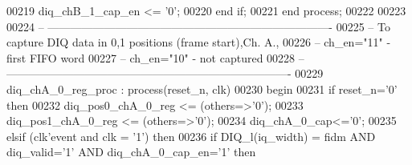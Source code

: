 \begin{DoxyCode}
00219       \textcolor{vhdlchar}{diq_chB_1_cap_en} \textcolor{vhdlchar}{<=} \textcolor{vhdlchar}{'}\textcolor{vhdllogic}{}\textcolor{vhdllogic}{0}\textcolor{vhdlchar}{'};
00220    \textcolor{keywordflow}{end} \textcolor{keywordflow}{if};
00221 \textcolor{keywordflow}{end} \textcolor{keywordflow}{process};
00222     
00223     
00224 \textcolor{keyword}{-- ----------------------------------------------------------------------------}
00225 \textcolor{keyword}{-- To capture DIQ data in 0,1 positions (frame start),Ch. A., }
00226 \textcolor{keyword}{-- ch\_en="11" - first FIFO word}
00227 \textcolor{keyword}{-- ch\_en="10" - not captured}
00228 \textcolor{keyword}{-- ----------------------------------------------------------------------------}
00229  diq\_chA\_0\_reg\_proc : \textcolor{keywordflow}{process}(reset_n, clk)
00230 \textcolor{vhdlkeyword}{    begin}
00231       \textcolor{keywordflow}{if} \textcolor{vhdlchar}{reset_n}\textcolor{vhdlchar}{=}\textcolor{vhdlchar}{'}\textcolor{vhdllogic}{}\textcolor{vhdllogic}{0}\textcolor{vhdlchar}{'} \textcolor{keywordflow}{then}
00232          \textcolor{vhdlchar}{diq_pos0_chA_0_reg} \textcolor{vhdlchar}{<=} \textcolor{vhdlchar}{(}\textcolor{keywordflow}{others}\textcolor{vhdlchar}{=}\textcolor{vhdlchar}{>}\textcolor{vhdlchar}{'}\textcolor{vhdllogic}{}\textcolor{vhdllogic}{0}\textcolor{vhdlchar}{'}\textcolor{vhdlchar}{)};
00233          \textcolor{vhdlchar}{diq_pos1_chA_0_reg} \textcolor{vhdlchar}{<=} \textcolor{vhdlchar}{(}\textcolor{keywordflow}{others}\textcolor{vhdlchar}{=}\textcolor{vhdlchar}{>}\textcolor{vhdlchar}{'}\textcolor{vhdllogic}{}\textcolor{vhdllogic}{0}\textcolor{vhdlchar}{'}\textcolor{vhdlchar}{)};
00234          \textcolor{vhdlchar}{diq_chA_0_cap}\textcolor{vhdlchar}{<=}\textcolor{vhdlchar}{'}\textcolor{vhdllogic}{}\textcolor{vhdllogic}{0}\textcolor{vhdlchar}{'};
00235       \textcolor{keywordflow}{elsif} \textcolor{vhdlchar}{(}\textcolor{vhdlchar}{clk}\textcolor{vhdlchar}{'}\textcolor{vhdlkeyword}{event} \textcolor{keywordflow}{and} \textcolor{vhdlchar}{clk} \textcolor{vhdlchar}{=} \textcolor{vhdlchar}{'}\textcolor{vhdllogic}{}\textcolor{vhdllogic}{1}\textcolor{vhdlchar}{'}\textcolor{vhdlchar}{)} \textcolor{keywordflow}{then}
00236             \textcolor{keywordflow}{if} \textcolor{vhdlchar}{DIQ_l}\textcolor{vhdlchar}{(}\textcolor{vhdlchar}{iq_width}\textcolor{vhdlchar}{)} \textcolor{vhdlchar}{=} \textcolor{vhdlchar}{fidm} \textcolor{keywordflow}{AND} \textcolor{vhdlchar}{diq_valid}\textcolor{vhdlchar}{=}\textcolor{vhdlchar}{'}\textcolor{vhdllogic}{}\textcolor{vhdllogic}{1}\textcolor{vhdlchar}{'} \textcolor{keywordflow}{AND} \textcolor{vhdlchar}{diq_chA_0_cap_en}\textcolor{vhdlchar}{=}\textcolor{vhdlchar}{'}\textcolor{vhdllogic}{}\textcolor{vhdllogic}{1}\textcolor{vhdlchar}{'} \textcolor{keywordflow}{then} 

\end{DoxyCode}
